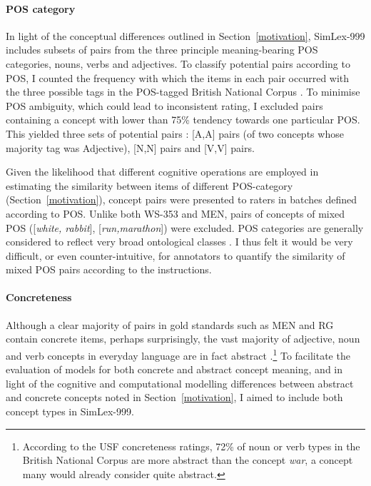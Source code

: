 \paragraph{POS category} In light of the conceptual differences outlined in Section~\ref{motivation}, SimLex-999 includes subsets of pairs from the three principle meaning-bearing POS categories, nouns, verbs and adjectives. To classify potential pairs according to POS, I counted the frequency with which the items in each pair occurred with the three possible tags in the  POS-tagged British National Corpus \cite{leech1994claws4}. To minimise POS ambiguity, which could lead to inconsistent rating, I excluded pairs containing a concept with lower than 75\% tendency towards one particular POS. This yielded three sets of potential pairs : [A,A] pairs (of two concepts whose majority tag was Adjective), [N,N] pairs and [V,V] pairs. 

Given the likelihood that different cognitive operations are employed in estimating the similarity between items of different POS-category (Section~\ref{motivation}), concept pairs were presented to raters in batches defined according to POS. Unlike both WS-353 and MEN, pairs of concepts of mixed POS ([\emph{white, rabbit}], [\emph{run,marathon}]) were excluded. POS categories are generally considered to reflect very broad ontological classes \cite{fellbaum1999wordnet}. I thus felt it would be very difficult, or even counter-intuitive, for annotators to quantify the similarity of mixed POS pairs according to the instructions. 

\paragraph{Concreteness} Although a clear majority of pairs in gold standards such as MEN and RG contain concrete items, perhaps surprisingly, the vast majority of adjective, noun and verb concepts in everyday language are in fact abstract \cite{hill2014multi,kielaimproving}.\footnote{According to the USF concreteness ratings, 72\% of noun or verb types in the British National Corpus are more abstract than the concept \emph{war}, a concept many would already consider quite abstract.} To facilitate the evaluation of models for both concrete and abstract concept meaning, and in light of the cognitive and computational modelling differences  between abstract and concrete concepts noted in Section~\ref{motivation}, I aimed to include both concept types in SimLex-999. 

